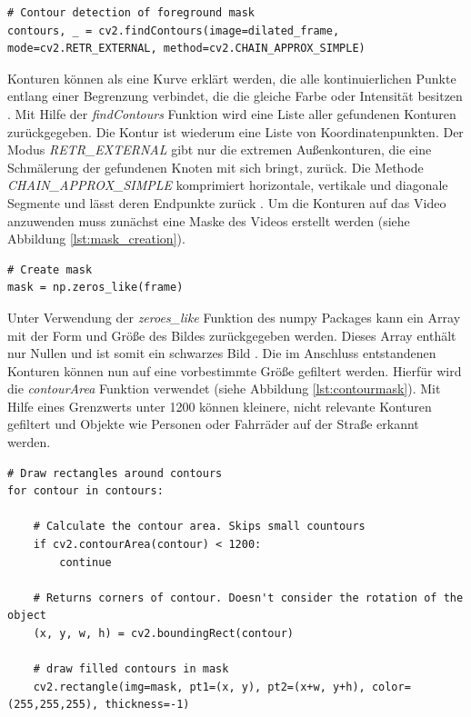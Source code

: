 \vspace*{10mm}
\begin{lstlisting}[caption={Finden aller Konturen in der Vordergrundmaske}, label={lst:foreground_dilation_detection}]
# Contour detection of foreground mask
contours, _ = cv2.findContours(image=dilated_frame, mode=cv2.RETR_EXTERNAL, method=cv2.CHAIN_APPROX_SIMPLE)
\end{lstlisting}

Konturen können als eine Kurve erklärt werden, die alle kontinuierlichen Punkte entlang einer Begrenzung verbindet, die die gleiche Farbe oder Intensität besitzen \cite{opencv_contour}. Mit Hilfe der \emph{findContours} Funktion wird eine Liste aller gefundenen Konturen zurückgegeben. Die Kontur ist wiederum eine Liste von Koordinatenpunkten. Der Modus \emph{RETR\_EXTERNAL} gibt nur die extremen Außenkonturen, die eine Schmälerung der gefundenen Knoten mit sich bringt, zurück. Die Methode \emph{CHAIN\_APPROX\_SIMPLE} komprimiert horizontale, vertikale und diagonale Segmente und lässt deren Endpunkte zurück \cite{openstruct}. Um die Konturen auf das Video anzuwenden muss zunächst eine Maske des Videos erstellt werden (siehe Abbildung \ref{lst:mask_creation}).

\vspace*{10mm}
\begin{lstlisting}[caption={Erstellung einer Maske des aktuellen Bildes}, label={lst:mask_creation}]
# Create mask
mask = np.zeros_like(frame)
\end{lstlisting}

Unter Verwendung der \emph{zeroes\_like} Funktion des numpy Packages kann ein Array mit der Form und Größe des Bildes zurückgegeben werden. Dieses Array enthält nur Nullen und ist somit ein schwarzes Bild \cite{numpyzeroeslike}.
Die im Anschluss entstandenen Konturen können nun auf eine vorbestimmte Größe gefiltert werden. Hierfür wird die \emph{contourArea} Funktion verwendet (siehe Abbildung \ref{lst:contourmask}). Mit Hilfe eines Grenzwerts unter 1200 können kleinere, nicht relevante Konturen gefiltert und Objekte wie Personen oder Fahrräder auf der Straße erkannt werden. 

\vspace*{10mm}
\begin{lstlisting}[caption={Erstellen einer Konturenmaske}, label={lst:contourmask}]
# Draw rectangles around contours
for contour in contours:
            
    # Calculate the contour area. Skips small countours
    if cv2.contourArea(contour) < 1200:
        continue
                
    # Returns corners of contour. Doesn't consider the rotation of the object
    (x, y, w, h) = cv2.boundingRect(contour)
                        
    # draw filled contours in mask
    cv2.rectangle(img=mask, pt1=(x, y), pt2=(x+w, y+h), color=(255,255,255), thickness=-1)
\end{lstlisting}


